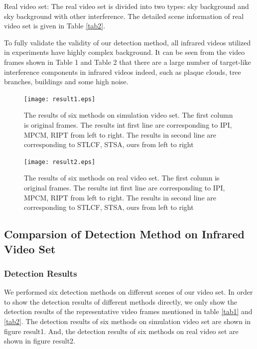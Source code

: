 \documentclass[journal]{IEEEtran}
\begin{document}
Real video set: The real video set is divided into two types: sky background and sky background with other interference. The detailed scene information of real video set is given in Table \ref{tab2}.

To fully validate the validity of our detection method, all infrared videos utilized in experiments have highly complex background. It can be seen from the video frames shown in Table 1 and Table 2 that there are a large number of target-like interference components in infrared videos indeed, such as plaque clouds, tree branches, buildings and some high noise.

\begin{figure}[ht]
  \centering
  \texttt{[image: result1.eps]}
  \caption{The results of six methods on simulation video set. The first column is original frames. The results int first line are corresponding to IPI, MPCM, RIPT from left to right. The results in second line are corresponding to STLCF, STSA, ours from left to right}
  \label{result1}
\end{figure}

\begin{figure}[ht]
  \centering
  \texttt{[image: result2.eps]}
  \caption{The results of six methods on real video set. The first column is original frames. The results int first line are corresponding to IPI, MPCM, RIPT from left to right. The results in second line are corresponding to STLCF, STSA, ours from left to right}
  \label{result1}
\end{figure}

\subsection{Comparsion of Detection Method on Infrared Video Set}
\subsubsection{Detection Results}
We performed six detection methods on different scenes of our video set. In order to show the detection results of different methods directly, we only show the detection results of the representative video frames mentioned in table \ref{tab1} and \ref{tab2}. The detection results of six methods on simulation video set are shown in figure result1. And, the detection results of six methods on real video set are shown in figure result2.
\end{document}
